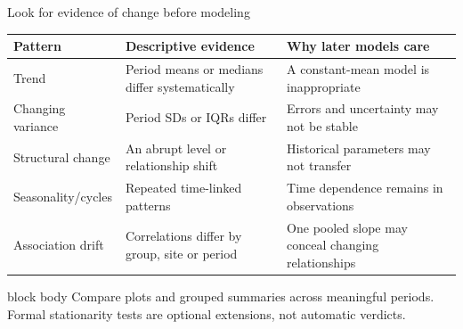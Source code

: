\documentclass[10pt,aspectratio=169]{beamer}
\begin{document}
\begin{frame}{Look for evidence of change before modeling}

\scriptsize

\begin{tabularx}{\textwidth}{lXX}
\toprule
\textbf{Pattern} & \textbf{Descriptive evidence} & \textbf{Why later models care} \\
\midrule
Trend & Period means or medians differ systematically & A constant-mean model is inappropriate \\
Changing variance & Period SDs or IQRs differ & Errors and uncertainty may not be stable \\
Structural change & An abrupt level or relationship shift & Historical parameters may not transfer \\
Seasonality/cycles & Repeated time-linked patterns & Time dependence remains in observations \\
Association drift & Correlations differ by group, site or period & One pooled slope may conceal changing relationships \\
\bottomrule
\end{tabularx}

\vspace{0.38cm}

\small

\begin{beamercolorbox}[rounded=true,sep=8pt]{block body}
Compare plots and grouped summaries across meaningful periods. Formal stationarity tests are optional extensions, not automatic verdicts.
\end{beamercolorbox}

\end{frame}
\end{document}
